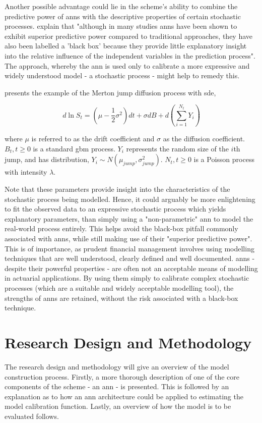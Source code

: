 \documentclass[11pt,oneside,openany,a4paper,english, report, goldenblock
]{usthesis}
\begin{document}
Another possible advantage could lie in the scheme's ability to combine the predictive power of \acrshort{ann}s with the descriptive properties of certain stochastic processes. \citet{Olden} explain that "although in many studies \acrshort{ann}s have been shown to exhibit superior predictive power compared to traditional approaches, they have also been labelled a 'black box' because they provide little explanatory insight into the relative influence of the independent variables in the prediction process". The approach, whereby the \acrshort{ann} is used only to calibrate a more expressive and widely understood model - a stochastic process - might help to remedy this.


\citet{Mongwe} presents the example of the Merton jump diffusion process with \acrshort{sde},

\begin{equation}
	d \ln{S_t}= \left( \mu - \frac{1}{2} \sigma^2 \right )dt+\sigma dB +d \left( \sum_{i=1}^{N_t} Y_i \right )
\end{equation}

where $ \mu $  is referred to as the drift coefficient and $ \sigma $ as the diffusion coefficient. $ B_{t}, t\geq 0$ is a standard \acrfull{gbm} process. $Y_i$ represents the random size of the $i$th jump, and has distribution, $Y_i \sim N \left( \mu_{jump}, \sigma_{jump}^2 \right )$. $N_t, t \geq 0$ is a Poisson process with intensity $\lambda$.


Note that these parameters provide insight into the characteristics of the stochastic process being modelled. Hence, it could arguably be more enlightening to fit the observed data to an expressive stochastic process which yields explanatory parameters, than simply using a "non-parametric" \acrshort{ann} to model the real-world process entirely. This helps avoid the black-box pitfall commonly associated with \acrshort{ann}s, while still making use of their "superior predictive power". This is of importance, as prudent financial management involves using modelling techniques that are well understood, clearly defined and well documented. \acrshort{ann}s - despite their powerful properties - are often not an acceptable means of modelling in actuarial applications. By using them simply to calibrate complex stochastic processes (which are a suitable and widely acceptable modelling tool), the strengths of \acrshort{ann}s are retained, without the risk associated with a black-box technique.

\section{Research Design and Methodology}
The research design and methodology will give an overview of the model construction process. Firstly, a more thorough description of one of the core components of the scheme - an \acrshort{ann} - is presented. This is followed by an explanation as to how an \acrshort{ann} architecture could be applied to estimating the model calibration function. Lastly, an overview of how the model is to be evaluated follows.
\end{document}
